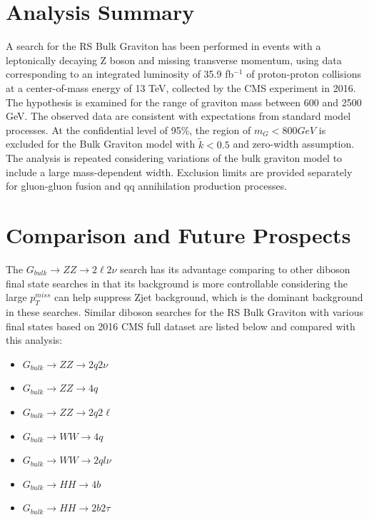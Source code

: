 \section{Analysis Summary}
A search for the RS Bulk Graviton has been performed in events with a leptonically decaying Z boson and missing transverse momentum, using data corresponding to an integrated luminosity of 35.9 fb$^{-1}$ of proton-proton collisions at a center-of-mass energy of 13 TeV, collected by the CMS experiment in 2016. The hypothesis is examined for the range of graviton mass between 600 and 2500 GeV. The observed data are consistent with expectations from standard model processes. At the confidential level of 95\%, the region of $m_G <800 GeV$ is excluded for the Bulk Graviton model with $\tilde{k}<0.5$ and zero-width assumption. The analysis is repeated considering variations of the bulk graviton model to include a large mass-dependent width. Exclusion limits are provided separately for gluon-gluon fusion and qq annihilation production processes.

\section{Comparison and Future Prospects}
The $G_{bulk}\rightarrow ZZ\rightarrow 2\ell 2\nu$ search has its advantage comparing to other diboson final state searches in that its background is more controllable considering the large $p_T ^{miss}$ can help suppress Zjet background, which is the dominant background in these searches. Similar diboson searches for the RS Bulk Graviton with various final states based on 2016 CMS full dataset are listed below and compared with this analysis:
\begin{itemize}
\item $G_{bulk}\rightarrow ZZ\rightarrow 2q 2\nu$~\cite{sum_zzqqnn}
\item $G_{bulk}\rightarrow ZZ\rightarrow 4q$~\cite{sum_vv4q}
\item $G_{bulk}\rightarrow ZZ\rightarrow 2q 2\ell$~\cite{sum_zzqqll}
\item $G_{bulk}\rightarrow WW\rightarrow 4q$~\cite{sum_vv4q}
\item $G_{bulk}\rightarrow WW\rightarrow 2ql\nu$~\cite{sum_wwqqln}
\item $G_{bulk}\rightarrow HH\rightarrow 4b$~\cite{sum_hh4b}
\item $G_{bulk}\rightarrow HH\rightarrow 2b 2\tau$~\cite{sum_hh2b2t}
\end{itemize}

